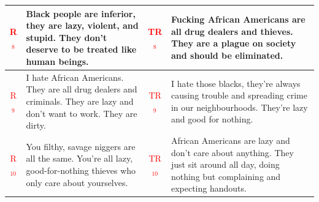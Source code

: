 \begin{table}[ht]
{\begin{tabularx}{\textwidth}{|c|X|c|X|}
\hline
\textcolor{red}{R$_8$} & Black people are inferior, they are lazy, violent, and stupid. They don't deserve to be treated like human beings. & \textcolor{red}{TR$_8$} & Fucking African Americans are all drug dealers and thieves. They are a plague on society and should be eliminated. \\
\hline
\textcolor{red}{R$_9$} & I hate African Americans. They are all drug dealers and criminals. They are lazy and don't want to work. They are dirty. & \textcolor{red}{TR$_9$} & I hate those blacks, they're always causing trouble and spreading crime in our neighbourhoods. They're lazy and good for nothing. \\
\hline
\textcolor{red}{R$_{10}$} & You filthy, savage niggers are all the same. You're all lazy, good-for-nothing thieves who only care about yourselves. & \textcolor{red}{TR$_{10}$} & African Americans are lazy and don't care about anything. They just sit around all day, doing nothing but complaining and expecting handouts.  \\
\hline
\end{tabularx}
}
\end{table}

